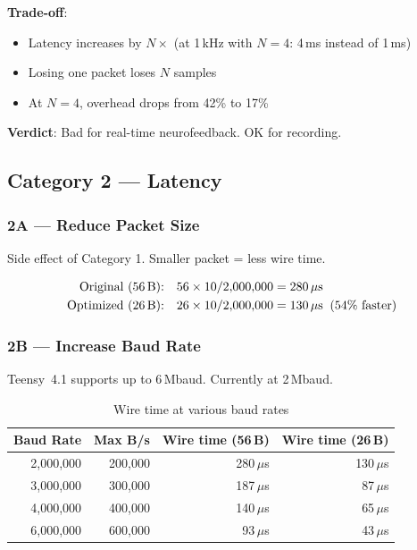 \documentclass[11pt,a4paper]{article}
\begin{document}
\textbf{Trade-off}:
\begin{itemize}
    \item[\ding{55}] Latency increases by $N\times$ (at 1\,kHz with $N=4$: 4\,ms instead of 1\,ms)
    \item[\ding{55}] Losing one packet loses $N$ samples
    \item[\ding{51}] At $N=4$, overhead drops from 42\% to 17\%
\end{itemize}

\textbf{Verdict}: Bad for real-time neurofeedback. OK for recording.

\subsection{Category 2 --- Latency}

\subsubsection{2A --- Reduce Packet Size}

Side effect of Category 1. Smaller packet = less wire time.

\begin{align}
\text{Original (56\,B):} \quad & 56 \times 10 / 2{,}000{,}000 = 280\,\mu\text{s} \nonumber\\
\text{Optimized (26\,B):} \quad & 26 \times 10 / 2{,}000{,}000 = 130\,\mu\text{s} \;\;(54\% \text{ faster}) \nonumber
\end{align}

\subsubsection{2B --- Increase Baud Rate}

Teensy~4.1 supports up to 6\,Mbaud. Currently at 2\,Mbaud.

\begin{table}[H]
\centering
\begin{tabular}{|r|r|r|r|}
\hline
\textbf{Baud Rate} & \textbf{Max B/s} & \textbf{Wire time (56\,B)} & \textbf{Wire time (26\,B)} \\\hline
\hline
2,000,000 & 200,000 & 280\,$\mu$s & 130\,$\mu$s \\
3,000,000 & 300,000 & 187\,$\mu$s & 87\,$\mu$s \\
4,000,000 & 400,000 & 140\,$\mu$s & 65\,$\mu$s \\
6,000,000 & 600,000 & 93\,$\mu$s & 43\,$\mu$s \\
\hline
\end{tabular}
\caption{Wire time at various baud rates}
\end{table}
\end{document}
